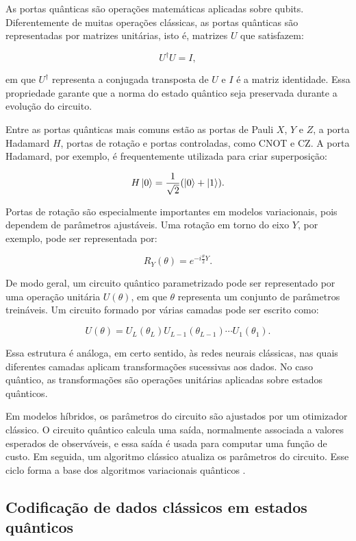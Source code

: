 \documentclass[
    12pt,
    openright,
    oneside,
    a4paper,
    english,
    brazil
]{abntex2}
\begin{document}
As portas quânticas são operações matemáticas aplicadas sobre qubits. Diferentemente de muitas operações clássicas, as portas quânticas são representadas por matrizes unitárias, isto é, matrizes \(U\) que satisfazem:

\[
U^\dagger U = I,
\]

em que \(U^\dagger\) representa a conjugada transposta de \(U\) e \(I\) é a matriz identidade. Essa propriedade garante que a norma do estado quântico seja preservada durante a evolução do circuito.

Entre as portas quânticas mais comuns estão as portas de Pauli \(X\), \(Y\) e \(Z\), a porta Hadamard \(H\), portas de rotação e portas controladas, como CNOT e CZ. A porta Hadamard, por exemplo, é frequentemente utilizada para criar superposição:

\[
H\ket{0} =
\frac{1}{\sqrt{2}}
(\ket{0} + \ket{1}).
\]

Portas de rotação são especialmente importantes em modelos variacionais, pois dependem de parâmetros ajustáveis. Uma rotação em torno do eixo \(Y\), por exemplo, pode ser representada por:

\[
R_Y(\theta) =
e^{-i\frac{\theta}{2}Y}.
\]

De modo geral, um circuito quântico parametrizado pode ser representado por uma operação unitária \(U(\theta)\), em que \(\theta\) representa um conjunto de parâmetros treináveis. Um circuito formado por várias camadas pode ser escrito como:

\[
U(\theta) =
U_L(\theta_L)
U_{L-1}(\theta_{L-1})
\cdots
U_1(\theta_1).
\]

Essa estrutura é análoga, em certo sentido, às redes neurais clássicas, nas quais diferentes camadas aplicam transformações sucessivas aos dados. No caso quântico, as transformações são operações unitárias aplicadas sobre estados quânticos.

Em modelos híbridos, os parâmetros do circuito são ajustados por um otimizador clássico. O circuito quântico calcula uma saída, normalmente associada a valores esperados de observáveis, e essa saída é usada para computar uma função de custo. Em seguida, um algoritmo clássico atualiza os parâmetros do circuito. Esse ciclo forma a base dos algoritmos variacionais quânticos \cite{cerezo2021variational}.

\subsection{Codificação de dados clássicos em estados quânticos}
\end{document}
